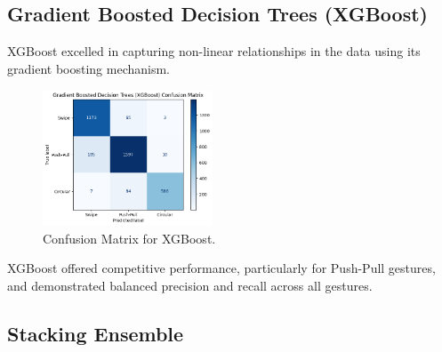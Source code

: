 \documentclass[10pt,twocolumn,letterpaper]{article}
\begin{document}
\subsection{Gradient Boosted Decision Trees (XGBoost)}

XGBoost excelled in capturing non-linear relationships in the data using its gradient boosting mechanism.

\begin{table}[h]
\small
\begin{center}
\caption{Performance Metrics for XGBoost}
\vspace{0.1cm}
\end{center}
\end{table}

\begin{figure}[h]
  \centering
  \includegraphics[width=0.45\textwidth]{figures/confusion_matrix_xgb.png}
  \caption{Confusion Matrix for XGBoost.}
  \label{fig:confusion_matrix_xgb}
\end{figure}

XGBoost offered competitive performance, particularly for Push-Pull gestures, and demonstrated balanced precision and recall across all gestures.

\subsection{Stacking Ensemble}
\end{document}
